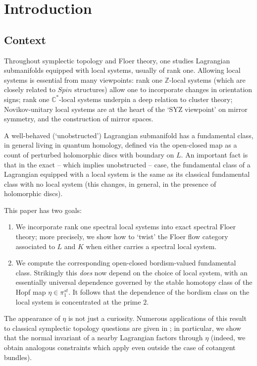 \documentclass{TPmod}
\def\bC{\mathbb{C}}
\def\bZ{\mathbb{Z}}
\def\bZ{\mathbb{Z}}
\numberwithin{equation}{section}
\begin{document}
\section{Introduction}

  \subsection{Context}

Throughout symplectic topology and Floer theory, one studies Lagrangian submanifolds equipped with local systems, usually of rank one. Allowing local systems is essential from many viewpoints: rank one $\bZ$-local systems (which are closely related to $Spin$ structures) allow one to incorporate changes in orientation signs; rank one $\bC^*$-local systems underpin a deep relation to cluster theory; Novikov-unitary local systems are at the heart of the `SYZ viewpoint' on mirror symmetry, and the construction of mirror spaces.  

A well-behaved (`unobstructed') Lagrangian submanifold has a fundamental class, in general living in quantum homology,   defined via the open-closed map as a count of perturbed holomorphic discs with boundary on $L$.  An important fact is that in the exact -- which implies unobstructed -- case, the fundamental class  of a Lagrangian equipped with a local system is the same as its classical fundamental class with no local system (this changes, in general, in the presence of holomorphic discs).

This paper has two goals:
\begin{enumerate}
    \item We incorporate rank one spectral local systems into exact spectral Floer theory; more precisely, we show how to `twist' the Floer flow category associated to $L$ and $K$ when either carries a spectral local system.  
    \item We compute the corresponding open-closed bordism-valued fundamental class. Strikingly this \emph{does} now depend on the choice of local system, with an essentially universal dependence governed by the stable homotopy class of the Hopf map $\eta \in \pi_1^{st}$. It follows that the dependence of the bordism class on the local system is concentrated at the prime $2$.
\end{enumerate}

The appearance of $\eta$ is not just a curiosity. Numerous applications of this result to classical symplectic topology questions are given in \cite{PS4}; in particular, we show that the normal invariant of a nearby Lagrangian factors through $\eta$ (indeed, we obtain analogous constraints which apply even outside the case of cotangent bundles).
\end{document}
